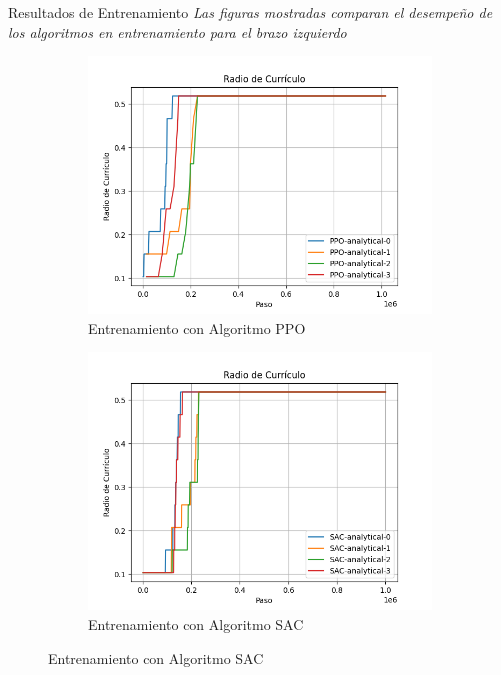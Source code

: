 \documentclass[spanish,10pt]{beamer}
\begin{document}
	\begin{frame}{Resultados de Entrenamiento}
		\textit{Las figuras mostradas comparan el desempeño de los algoritmos en entrenamiento para el brazo izquierdo}\\[1em]
		
		\begin{figure}[h!]
			\centering
			
			\begin{subfigure}[b]{0.48\textwidth}
				\centering
				\includegraphics[width=\textwidth]{images/graphs/PPO/Left/curriculum_radius}
				\caption{Entrenamiento con Algoritmo PPO}
				\label{fig:train-ppo-curr-left}
			\end{subfigure}
			\hfill
			\begin{subfigure}[b]{0.48\textwidth}
				\centering
				\includegraphics[width=\textwidth]{images/graphs/SAC/Left/curriculum_radius}
				\caption{Entrenamiento con Algoritmo SAC}
				\label{fig:train-sac-curr-left}
			\end{subfigure}
		\end{figure}
	\end{frame}
	
\end{document}
